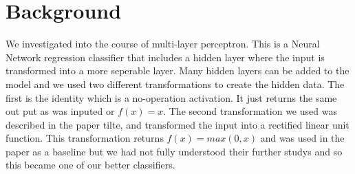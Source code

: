 
\section{Background}
\label{sec:background}

We investigated into the course of multi-layer perceptron. This is a
Neural Network regression classifier that includes a hidden layer
where the input is transformed into a more seperable layer. Many
hidden layers can be added to the model and we used two different
transformations to create the hidden data. The first is the identity
which is a no-operation activation. It just returns the same out put
as was inputed or $f(x)=x$. The second transformation we used was
described in the paper tilte,
and transformed the input into a rectified linear unit function.\cite{milgram} This
transformation returns $f(x)=max(0,x)$ and was used in the paper as a
baseline but we had not fully understood their further studys and so
this became one of our better classifiers. \\




